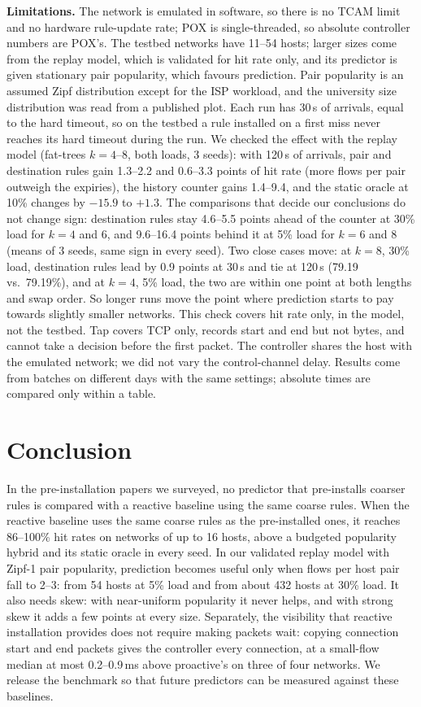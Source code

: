 \documentclass[conference]{IEEEtran}
\begin{document}
\textbf{Limitations.} The network is emulated in software, so there is no TCAM limit and no hardware rule-update rate; POX is single-threaded, so absolute controller numbers are POX's. The testbed networks have 11--54 hosts; larger sizes come from the replay model, which is validated for hit rate only, and its predictor is given stationary pair popularity, which favours prediction. Pair popularity is an assumed Zipf distribution except for the ISP workload, and the university size distribution was read from a published plot. Each run has 30\,s of arrivals, equal to the hard timeout, so on the testbed a rule installed on a first miss never reaches its hard timeout during the run. We checked the effect with the replay model (fat-trees $k{=}4$--8, both loads, 3 seeds): with 120\,s of arrivals, pair and destination rules gain 1.3--2.2 and 0.6--3.3 points of hit rate (more flows per pair outweigh the expiries), the history counter gains 1.4--9.4, and the static oracle at 10\% changes by $-15.9$ to $+1.3$. The comparisons that decide our conclusions do not change sign: destination rules stay 4.6--5.5 points ahead of the counter at 30\% load for $k{=}4$ and 6, and 9.6--16.4 points behind it at 5\% load for $k{=}6$ and 8 (means of 3 seeds, same sign in every seed). Two close cases move: at $k{=}8$, 30\% load, destination rules lead by 0.9 points at 30\,s and tie at 120\,s (79.19 vs.\ 79.19\%), and at $k{=}4$, 5\% load, the two are within one point at both lengths and swap order. So longer runs move the point where prediction starts to pay towards slightly smaller networks. This check covers hit rate only, in the model, not the testbed. Tap covers TCP only, records start and end but not bytes, and cannot take a decision before the first packet. The controller shares the host with the emulated network; we did not vary the control-channel delay. Results come from batches on different days with the same settings; absolute times are compared only within a table.

\section{Conclusion}
In the pre-installation papers we surveyed, no predictor that pre-installs coarser rules is compared with a reactive baseline using the same coarse rules. When the reactive baseline uses the same coarse rules as the pre-installed ones, it reaches 86--100\% hit rates on networks of up to 16 hosts, above a budgeted popularity hybrid and its static oracle in every seed. In our validated replay model with Zipf-1 pair popularity, prediction becomes useful only when flows per host pair fall to 2--3: from 54 hosts at 5\% load and from about 432 hosts at 30\% load. It also needs skew: with near-uniform popularity it never helps, and with strong skew it adds a few points at every size. Separately, the visibility that reactive installation provides does not require making packets wait: copying connection start and end packets gives the controller every connection, at a small-flow median at most 0.2--0.9\,ms above proactive's on three of four networks. We release the benchmark so that future predictors can be measured against these baselines.
\end{document}
